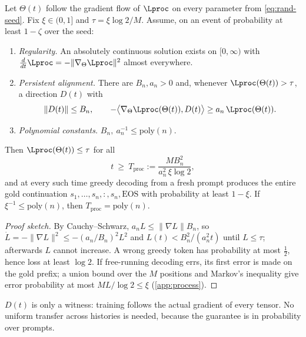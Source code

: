 \begin{theorem}\label{thm:process}
Let $\Theta(t)$ follow the gradient flow of $\Lproc$ on every parameter from \cref{eq:rand-seed}. Fix $\xi\in(0,1]$ and $\tau=\xi\log2/M$. Assume, on an event of probability at least $1-\zeta$ over the seed:
\begin{enumerate}[label=(P\arabic*),ref=(P\arabic*),leftmargin=*,itemsep=1pt]
\item\label{hyp:regular} \emph{Regularity.} An absolutely continuous solution exists on $[0,\infty)$ with $\frac{d}{dt}\Lproc=-\|\nabla_\Theta\Lproc\|^2$ almost everywhere.
\item\label{hyp:align} \emph{Persistent alignment.} There are $B_n,a_n>0$ and, whenever $\Lproc(\Theta(t))>\tau$, a direction $D(t)$ with
\begin{equation}\label{eq:align}
\|D(t)\|\le B_n,\qquad -\bigl\langle\nabla_\Theta\Lproc(\Theta(t)),D(t)\bigr\rangle\ge a_n\,\Lproc(\Theta(t)).
\end{equation}
\item\label{hyp:poly} \emph{Polynomial constants.} $B_n,\ a_n^{-1}\le\mathrm{poly}(n)$.
\end{enumerate}
Then $\Lproc(\Theta(t))\le\tau$ for all
\begin{equation}\label{eq:proc-time}
t\ \ge\ T_{\mathrm{proc}}:=\frac{M B_n^2}{a_n^2\,\xi\log2},
\end{equation}
and at every such time greedy decoding from a fresh prompt produces the entire gold continuation $s_1,\ldots,s_n,{:},s_n,\mathrm{EOS}$ with probability at least $1-\xi$. If $\xi^{-1}\le\mathrm{poly}(n)$, then $T_{\mathrm{proc}}=\mathrm{poly}(n)$.
\end{theorem}
\begin{proof}[Proof sketch]
By Cauchy--Schwarz, $a_nL\le\|\nabla L\|B_n$, so $\dot L=-\|\nabla L\|^2\le-(a_n/B_n)^2L^2$ and $L(t)<B_n^2/(a_n^2t)$ until $L\le\tau$; afterwards $L$ cannot increase. A wrong greedy token has probability at most $\frac12$, hence loss at least $\log2$. If free-running decoding errs, its first error is made on the gold prefix; a union bound over the $M$ positions and Markov's inequality give error probability at most $ML/\log2\le\xi$ (\cref{app:process}).
\end{proof}
$D(t)$ is only a witness: training follows the actual gradient of every tensor. No uniform transfer across histories is needed, because the guarantee is in probability over prompts.

